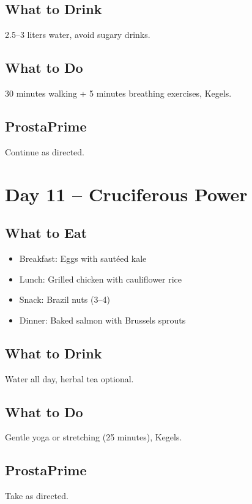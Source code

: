 \documentclass[11pt,oneside]{book}
\begin{document}
\section*{What to Drink}
2.5--3 liters water, avoid sugary drinks.

\section*{What to Do}
30 minutes walking + 5 minutes breathing exercises, Kegels.

\section*{ProstaPrime}
Continue as directed.

\clearpage


\chapter*{Day 11 – Cruciferous Power}

\section*{What to Eat}
\begin{itemize}[leftmargin=*]
\item Breakfast: Eggs with sautéed kale
\item Lunch: Grilled chicken with cauliflower rice
\item Snack: Brazil nuts (3--4)
\item Dinner: Baked salmon with Brussels sprouts
\end{itemize}

\section*{What to Drink}
Water all day, herbal tea optional.

\section*{What to Do}
Gentle yoga or stretching (25 minutes), Kegels.

\section*{ProstaPrime}
Take as directed.
\end{document}
